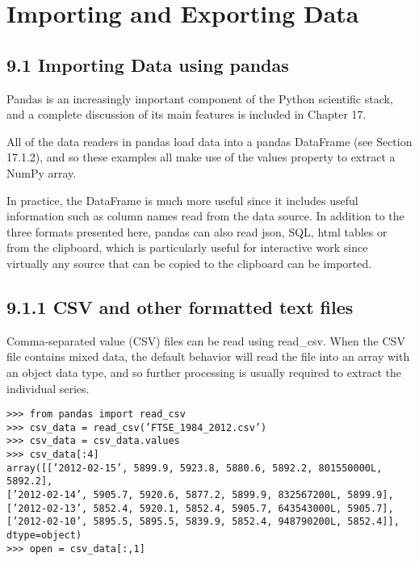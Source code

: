 \section{Importing and Exporting Data}

\subsection{9.1 Importing Data using pandas}

Pandas is an increasingly important component of the Python scientific stack, and a complete discussion
of its main features is included in Chapter 17. 

All of the data readers in pandas load data into a pandas
DataFrame (see Section 17.1.2), and so these examples all make use of the values property to extract a
NumPy array. 

In practice, the DataFrame is much more useful since it includes useful information such
as column names read from the data source. In addition to the three formats presented here, pandas can
also read json, SQL, html tables or from the clipboard, which is particularly useful for interactive work
since virtually any source that can be copied to the clipboard can be imported.

\subsection{9.1.1 CSV and other formatted text files}

Comma-separated value (CSV) files can be read using read_csv. When the CSV file contains mixed data,
the default behavior will read the file into an array with an object data type, and so further processing is
usually required to extract the individual series.

\begin{framed}
\begin{verbatim}
>>> from pandas import read_csv
>>> csv_data = read_csv(’FTSE_1984_2012.csv’)
>>> csv_data = csv_data.values
>>> csv_data[:4]
array([[’2012-02-15’, 5899.9, 5923.8, 5880.6, 5892.2, 801550000L, 5892.2],
[’2012-02-14’, 5905.7, 5920.6, 5877.2, 5899.9, 832567200L, 5899.9],
[’2012-02-13’, 5852.4, 5920.1, 5852.4, 5905.7, 643543000L, 5905.7],
[’2012-02-10’, 5895.5, 5895.5, 5839.9, 5852.4, 948790200L, 5852.4]], dtype=object)
>>> open = csv_data[:,1]
\end{verbatim}
\end{framed}
